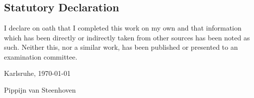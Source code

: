 \chapter*{}
\section*{Statutory Declaration}

I declare on oath that I completed this work on my own and that information
which has been directly or indirectly taken from other sources has been noted as
such. Neither this, nor a similar work, has been published or presented to an
examination committee.

Karlsruhe, \today

\vspace{1em}
\makebox[5cm]{\hrulefill}

Pippijn van Steenhoven


